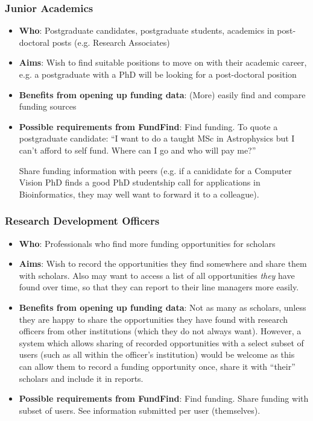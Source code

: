 \subsubsection{Junior Academics}
\begin{itemize}
 \item \textbf{Who}: Postgraduate candidates, postgraduate students, academics in post-doctoral posts (e.g. Research Associates)
 \item \textbf{Aims}: Wish to find suitable positions to move on with their academic career, e.g. a postgraduate with a PhD will be looking for a post-doctoral position
 \item \textbf{Benefits from opening up funding data}: (More) easily find and compare funding sources
 \item \textbf{Possible requirements from FundFind}: Find funding. To quote a postgraduate candidate: ``I want to do a taught MSc in Astrophysics but I can't afford to self fund. Where can I go and who will pay me?''
 
 Share funding information with peers (e.g. if a canididate for a Computer Vision PhD finds a good PhD studentship call for applications in Bioinformatics, they may well want to forward it to a colleague).
\end{itemize}

\subsubsection{Research Development Officers}
\label{audience-research-officers}
\begin{itemize}
 \item \textbf{Who}: Professionals who find more funding opportunities for scholars
 \item \textbf{Aims}: Wish to record the opportunities they find somewhere and share them with scholars. Also may want to access a list of all opportunities \emph{they} have found over time, so that they can report to their line managers more easily.
 \item \textbf{Benefits from opening up funding data}: Not as many as scholars, unless they are happy to share the opportunities they have found with research officers from other institutions (which they do not always want). However, a system which allows sharing of recorded opportunities with a select subset of users (such as all within the officer's institution) would be welcome as this can allow them to record a funding opportunity once, share it with ``their'' scholars and include it in reports.
 \item \textbf{Possible requirements from FundFind}: Find funding. Share funding with subset of users. See information submitted per user (themselves).
\end{itemize}

